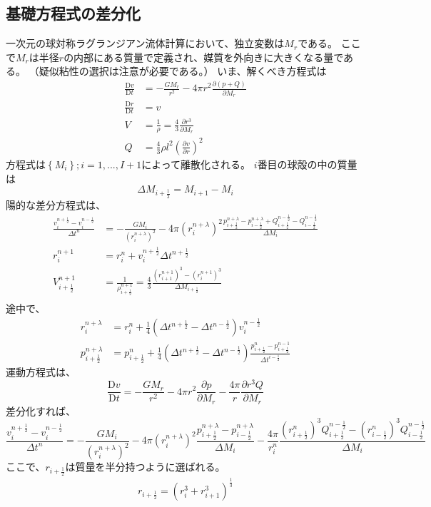 \documentclass{jsarticle}
\newcommand{\pder}[2][]{\frac{\partial#1}{\partial#2}}
\newcommand{\Dder}[2][]{\frac{\mathrm{D}#1}{\mathrm{D}#2}}
\newcommand{\half}{\frac{1}{2}}
\newcommand{\hpn}{n + \half}
\newcommand{\hpi}{i + \half}
\newcommand{\hmi}{i - \half}
\newcommand{\beq}{\begin{equation}}
\newcommand{\eeq}{\end{equation}}
\begin{document}
\subsection{基礎方程式の差分化}
一次元の球対称ラグランジアン流体計算において、独立変数は$M_r$である。
ここで$M_r$は半径$r$の内部にある質量で定義され、媒質を外向きに大きくなる量である。
（疑似粘性の選択は注意が必要である。）
いま、解くべき方程式は
\begin{align}
    \Dder[v]{t} &= - \frac{GM_r}{r^2} - 4\pi r^2\pder[(p + Q)]{M_r}\\
    \Dder[r]{t} &= v\\
    V &= \frac{1}{\rho}=\frac{4}{3}\pder[r^3]{M_r}\\
    Q &= \frac{4}{3}\rho l^2 (\pder[v]{r})^2\label{eq:q}
\end{align}
方程式は$\left\{M_i\right\};i = 1,...,I+1$によって離散化される。
$i$番目の球殻の中の質量は
\beq
    \Delta M_{i+\half} = M_{i+1} - M_i
\eeq
陽的な差分方程式は、
\begin{align}
    \frac{v^{n+\half}_i - v^{n-\half}_i}{\Delta t^n} &= -\frac{GM_i}{(r^{n+\lambda}_i)^2}
    -4\pi(r^{n+\lambda}_i)^2
    \frac{p^{n+\lambda}_{i+\half} - p^{n+\lambda}_{i-\half}+Q^{n-\half}_{i+\half} - Q^{n-\half}_{i-\half}}{\Delta M_i}\\
    r^{n+1}_i &= r^{n}_i + v^{\hpn}_i \Delta t^{\hpn}\\
    V^{n+1}_{\hpi} &= \frac{1}{\rho^{n+1}_{\hpi}}=\frac{4}{3}\frac{(r^{n+1}_{i+1})^3 - (r^{n+1}_{i})^3}{\Delta M_{\hpi}}\\
\end{align}
途中で、
\begin{align}
    r^{n+\lambda}_i &= r^n_i + \frac{1}{4} (\Delta t^{n+\half} - \Delta t^{n-\half})v^{n-\half}_i\\
    p^{n+\lambda}_{\hpi} &=  p^{n}_{\hpi} + \frac{1}{4} (\Delta t^{n+\half} - \Delta t^{n-\half})
    \frac{p^{n}_{\hpi} - p^{n-1}_{\hpi}}{\Delta t^{\hmi}}
\end{align}
運動方程式は、
\beq
    \Dder[v]{t} = - \frac{GM_r}{r^2} - 4\pi r^2\pder[p]{M_r} - \frac{4\pi}{r}\pder[r^3Q]{M_r}
\eeq
差分化すれば、
\beq
    \frac{v^{n+\half}_i - v^{n-\half}_i}{\Delta t^n} =
    -\frac{GM_i}{(r^{n+\lambda}_i)^2}
    -4\pi(r^{n+\lambda}_i)^2
    \frac{p^{n+\lambda}_{i+\half} - p^{n+\lambda}_{i-\half}}{\Delta M_i}
    -\frac{4\pi}{r^{n}_i}
    \frac{(r^{n}_{i+\half})^3Q^{n-\half}_{i+\half} - (r^{n}_{i-\half})^3Q^{n-\half}_{i-\half}}{\Delta M_i}
\eeq
ここで、$r_{i+\half}$は質量を半分持つように選ばれる。
\begin{align}
    r_{i+\half} = (r^3_i + r^3_{i+1})^{\frac{1}{3}}
\end{align}
\end{document}
